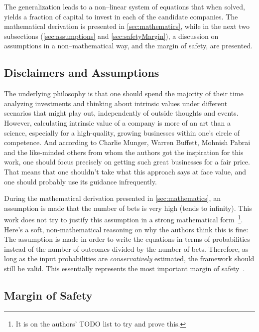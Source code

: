 \documentclass{article}
\begin{document}
The generalization leads to a non--linear system of equations that when solved,
yields a fraction of capital to invest in each of the candidate companies. The
mathematical derivation is presented in \autoref{sec:mathematics}, while in the
next two subsections (\autoref{sec:assumptions} and \autoref{sec:safetyMargin}),
a discussion on assumptions in a non--mathematical way, and the margin of
safety, are presented.

\subsection{Disclaimers and Assumptions}
\label{sec:assumptions}

The underlying philosophy is that one should spend the majority of their time
analyzing investments and thinking about intrinsic values under different
scenarios that might play out, independently of outside thoughts and events.
However, calculating intrinsic value of a company is more of an art than a
science, especially for a high-quality, growing businesses within one's circle
of competence. And according to Charlie Munger, Warren Buffett, Mohnish Pabrai
and the like-minded others from whom the authors got the inspiration for this
work, one should focus precisely on getting such great businesses for a fair
price. That means that one shouldn't take what this approach says at face value,
and one should probably use its guidance infrequently.

During the mathematical derivation presented in \autoref{sec:mathematics}, an
assumption is made that the number of bets is very high (tends to infinity).
This work does not try to justify this assumption in a strong mathematical
form~\footnote{It is on the authors' TODO list to try and prove this.}. Here's a
soft, non-mathematical reasoning on why the authors think this is fine: The
assumption is made in order to write the equations in terms of probabilities
instead of the number of outcomes divided by the number of bets. Therefore, as
long as the input probabilities are \textit{conservatively} estimated, the
framework should still be valid. This essentially represents the most important
margin of safety~\cite{intelligentInvestor}.

\subsection{Margin of Safety}
\label{sec:safetyMargin}
\end{document}
